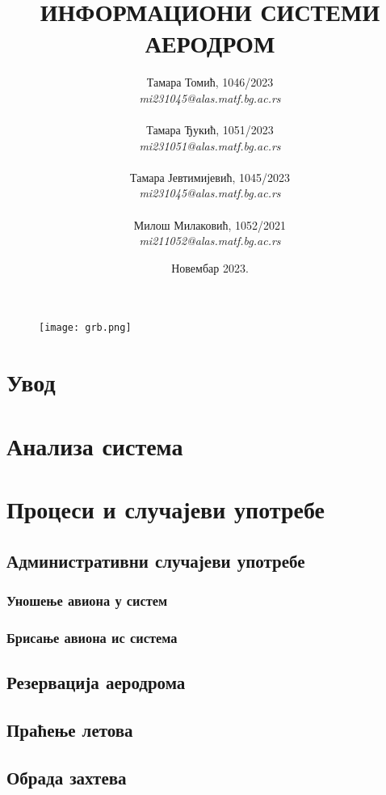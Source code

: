 \documentclass{article}
\title{\textbf{ИНФОРМАЦИОНИ СИСТЕМИ} \\
\vspace{10}
\Large{\textbf{АЕРОДРОМ}}}
\author{Тамара Томић, 1046/2023 \\ \textit{mi231045@alas.matf.bg.ac.rs} \\\\
        Тамара Ђукић, 1051/2023 \\ \textit{mi231051@alas.matf.bg.ac.rs} \\\\
        Тамара Јевтимијевић, 1045/2023 \\ \textit{mi231045@alas.matf.bg.ac.rs} \\\\
        Милош Милаковић, 1052/2021 \\ \textit{mi211052@alas.matf.bg.ac.rs}}
\date{Новембар 2023.}
\begin{document}
\maketitle

\vspace{17}
\begin{figure}[h!]
    \centering
    \texttt{[image: grb.png]}
\end{figure} 

\newpage
\tableofcontents

\newpage

\section{Увод}

\section{Анализа система}

\section{Процеси и случајеви употребе}

\subsection{Административни случајеви употребе}

\subsubsection{Уношење авиона у систем}

\subsubsection{Брисање авиона ис система}

\subsection{Резервација аеродрома}

\subsection{Праћење летова}

\subsection{Обрада захтева}
\end{document}
